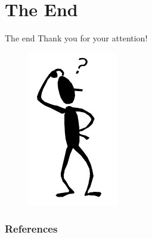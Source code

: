 \documentclass[hyperref={pdfpagelabels=false}]{beamer}
\begin{document}
\section*{The End}
\begin{frame}{The end}
\centering
\LARGE
\color{red}
Thank you for your attention!
\nocite{Cho_LearningG}
\end{frame}
\begin{frame}
\centering
\begin{figure}
	\includegraphics{who.png}
\end{figure}
\end{frame}
\begin{frame}[allowframebreaks]
	\frametitle{References}
	
	
\end{frame} 
\end{document}
